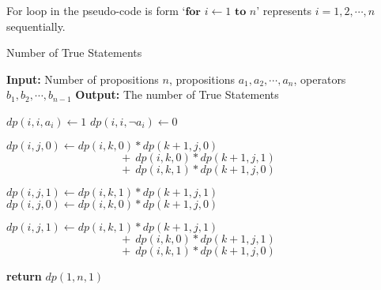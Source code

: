 For loop in the pseudo-code is form `$\textbf{for } i \gets 1 \textbf{ to } n$' represents $i=1,2,\cdots,n$ sequentially.
\begin{algorithm}
    \caption{Number of True Statements}\label{alg:problem-5}
    \begin{algorithmic}[1]
    \State \textbf{Input:} Number of propositions $n$, propositions $a_1,a_2,\cdots,a_n$, operators $b_1,b_2,\cdots,b_{n-1}$
    \State \textbf{Output:} The number of True Statements

        \State $dp(i,i,a_i) \gets 1$
        \State $dp(i,i,\neg a_i) \gets 0$
    \EndFor
    
                    \State $dp(i,j,0) \gets dp(i,k,0) * dp(k+1,j,0)$
                    \Statex $\quad\quad\quad\quad\quad\quad\quad\quad\quad\quad\  +\ dp(i,k,0) * dp(k+1,j,1)$
                    \Statex $\quad\quad\quad\quad\quad\quad\quad\quad\quad\quad\  +\ dp(i,k,1) * dp(k+1,j,0)$
                    
                    \State $dp(i,j,1) \gets dp(i,k,1)*dp(k+1,j,1)$
                \Else
                    \State $dp(i,j,0) \gets dp(i,k,0) * dp(k+1,j,0)$
                    
                    \State $dp(i,j,1) \gets dp(i,k,1)*dp(k+1,j,1)$
                    \Statex $\quad\quad\quad\quad\quad\quad\quad\quad\quad\quad\  +\ dp(i,k,0) * dp(k+1,j,1)$
                    \Statex $\quad\quad\quad\quad\quad\quad\quad\quad\quad\quad\  +\ dp(i,k,1) * dp(k+1,j,0)$
                    
                    \EndIf
            \EndFor
        \EndFor
    \EndFor


    \State \textbf{return} $dp(1,n,1)$
    \end{algorithmic}
\end{algorithm}






\newpage
